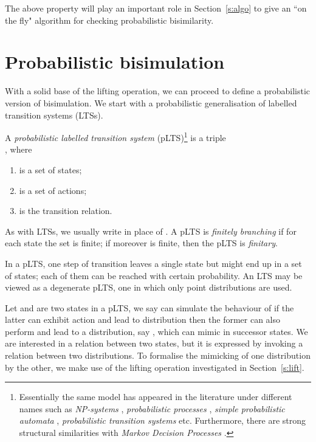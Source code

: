 \documentclass{article}
\begin{document}
The above property will play an important role in
Section~\ref{s:algo} to give an ``on the fly" algorithm for checking
probabilistic bisimilarity.

\section{Probabilistic bisimulation}\label{s:pbisi}
With a solid base of the lifting operation, we can proceed to define
a probabilistic version of bisimulation. We start with a
probabilistic generalisation of labelled transition systems (LTSs).
\begin{definition}
A \emph{probabilistic labelled transition
system}
(pLTS)\footnote{Essentially the same model has appeared in the
literature under different names such as \emph{NP-systems}
\cite{JHW94}, \emph{probabilistic processes} \cite{JW95},
\emph{simple probabilistic automata} \cite{Seg95},
\emph{probabilistic transition systems} \cite{JW02} etc.
Furthermore, there are strong structural similarities with
\emph{Markov
  Decision Processes} \cite{Put94,DGMZ07}.} is a triple\\
, where
\begin{enumerate}
\item  is a set of states;
\item  is a set of actions;
\item  is the transition relation.
\end{enumerate}
As with LTSs, we usually write  in place of
.
A pLTS is \emph{finitely branching} if for each state  the
set  is finite; if moreover  is
finite, then the pLTS is \emph{finitary}.
\end{definition}

In a pLTS, one step of transition leaves a single state but might
end up in a set of states; each of them can be reached with certain
probability. An LTS may be viewed as a degenerate pLTS, one in which
only point distributions are used.

Let  and  are two states in a pLTS, we say  can simulate
the behaviour of  if the latter can exhibit action  and lead
to distribution  then the former can also perform  and
lead to a distribution, say , which can mimic  in
successor states. We are interested in a relation between two
states, but it is expressed by invoking a relation between two
distributions. To formalise the mimicking of one distribution by the
other, we make use of the lifting operation investigated in
Section~\ref{s:lift}.
\end{document}
